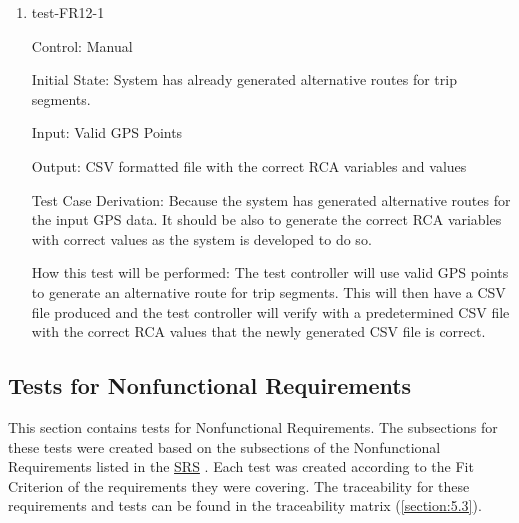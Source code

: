 \documentclass[12pt, titlepage]{article}
\begin{document}
\begin{enumerate}

\begin{comment}

\item{test-FR12-1\\} \label{test-FR12-1}

Control: Manual 
					
Initial State: Control has already generated alternative routes for trip segments in SHP format with a digital road/pedestrian network and ready to move forward. 
					
Input:  alternative routes in CSV format 
					
Output: Each RCA variables with assigned variables 

Test Case Derivation: 
					
How this test will be performed: 
\end{comment}
\item{test-FR12-1\\} \label{test-FR12-1}

Control: Manual 
					
Initial State: System has already generated alternative routes for trip segments.
					
Input: Valid GPS Points
					
Output: CSV formatted file with the correct RCA variables and values

Test Case Derivation: Because the system has generated alternative routes for the input GPS data. It should be also to generate the correct RCA variables with correct values as the system is developed to do so.
					
How this test will be performed: The test controller will use valid GPS points to generate an alternative route for trip segments. This will then have a CSV file produced and the test controller will verify with a predetermined CSV file with the correct RCA values that the newly generated CSV file is correct.

\end{enumerate}

\subsection{Tests for Nonfunctional Requirements}
This section contains tests for Nonfunctional Requirements. The subsections for these tests were created based on the subsections of the Nonfunctional Requirements listed in the \href{https://github.com/paezha/PyERT-BLACK/blob/main/docs/SRS/SRS.pdf}{SRS} \citep{SRS}. Each test was created according to the Fit Criterion of the requirements they were covering. The traceability for these requirements and tests can be found in the traceability matrix (\ref{section:5.3}). 
\end{document}
